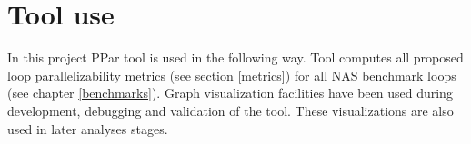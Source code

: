 \section{Tool use} 
\label{ppar-tool-use}
\qquad In this project PPar tool is used in the following way. Tool computes all proposed loop parallelizability metrics (see section \ref{metrics}) for all NAS benchmark loops (see chapter \ref{benchmarks}). Graph visualization facilities have been used during development, debugging and validation of the tool. These visualizations are also used in later analyses stages.